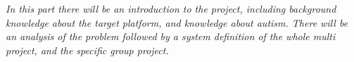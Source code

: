 \textit{In this part there will be an introduction to the project, including background knowledge about the target platform, and knowledge about autism. There will be an analysis of the problem followed by a system definition of the whole multi project, and the specific group project.}